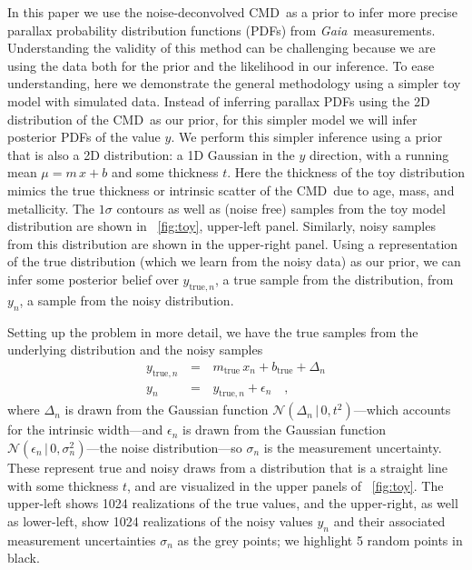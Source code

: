 \documentclass[modern]{aastex61}
\newcommand{\acronym}[1]{{\small{#1}}}
\newcommand{\project}[1]{\textsl{#1}}
\newcommand{\gaia}{\project{Gaia}}
\newcommand{\cmd}{\acronym{CMD}}
\newcommand{\given}{\,|\,}
\newcommand{\true}{\mathrm{true}}
\begin{document}
In this paper we use the noise-deconvolved \cmd\ as a prior to infer more precise parallax probability distribution functions (PDFs) from \gaia\ measurements.
Understanding the validity of this method can be challenging because we are using the data both for the prior and the likelihood in our inference.
To ease understanding, here we demonstrate the general methodology using a
simpler toy model with simulated data.
Instead of inferring parallax PDFs using the 2D distribution of the \cmd\ as our prior, for this simpler model we will infer posterior PDFs of the value $y$.
We perform this simpler inference using a prior that is also a 2D distribution: a 1D Gaussian in the $y$ direction, with a running mean $\mu = m\,x + b$ and some thickness $t$.
Here the thickness of the toy distribution mimics the true thickness or intrinsic scatter of the \cmd\ due to age, mass, and metallicity.
The $1\sigma$ contours as well as (noise free) samples from the toy model distribution are shown in \figurename~\ref{fig:toy}, upper-left panel.
Similarly, noisy samples from this distribution are shown in the upper-right panel.
Using a representation of the true distribution (which we learn from the noisy data) as our prior, we can infer some posterior belief over $y_{\true,n}$, a true sample from the distribution, from $y_n$, a sample from the noisy distribution.

Setting up the problem in more detail, we have the true samples from the underlying distribution and the noisy samples
\begin{eqnarray}
y_{\true, n} \, &=& \, m_{\true}\,x_n + b_{\true} + \Delta_n \\
y_n \, &=& \, y_{\true,n} + \epsilon_n \quad,
\label{eq:ytrue}
\end{eqnarray}
where $\Delta_n$ is drawn from the Gaussian function $\mathcal{N}(\Delta_n \given 0, t^2)$---which accounts for the intrinsic width---and $\epsilon_n$ is drawn from the Gaussian function $\mathcal{N}(\epsilon_n \given 0, \sigma_n^2)$---the noise distribution---so $\sigma_n$ is the measurement uncertainty.
These represent true and noisy draws from a distribution that is a straight line with some thickness $t$, and are visualized in the upper panels of \figurename~\ref{fig:toy}.
The upper-left shows 1024 realizations of the true values, and the upper-right, as well as lower-left, show 1024 realizations of the noisy values $y_n$ and their associated measurement uncertainties $\sigma_n$ as the grey points; we highlight 5 random points in black.
\end{document}
